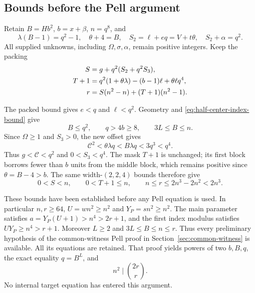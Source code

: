 \subsection{Bounds before the Pell argument}

Retain $B=Hb^2$, $b=x+\beta$, $n=q^8$, and
\begin{equation}\label{eq:half-center-coding}
 \lambda(B-1)=q^2-1,\quad \theta+4=B,\quad
 S_2=\ell+eq=V+t\theta,\quad S_2+\alpha=q^2.
\end{equation}
All supplied unknowns, including $\Omega,\sigma,\alpha$, remain
positive integers. Keep the packing
\begin{align}
 S&=g+q^2(S_2+q^2S_3),\notag\\
 T+1&=q^2(1+\theta\lambda)-(b-1)\ell+\theta\ell q^4,\notag\\
 r&=S(n^2-n)+(T+1)(n^2-1).\label{eq:half-center-packing}
\end{align}

The packed bound gives $e<q$ and $\ell<q^2$. Geometry and
\eqref{eq:half-center-index-bound} give
\[
 B\le q^2,\qquad q>4b\ge8,\qquad 3L\le B\le n.
\]
Since $\Omega\ge1$ and $S_3>0$, the new offset gives
\begin{equation}\label{eq:half-center-preliminary-C}
 \mathcal C^2<\theta\lambda q<B\lambda q<3q^3<q^4.
\end{equation}
Thus $g<\mathcal C<q^2$ and $0<S_3<q^4$. The mask $T+1$ is
unchanged; its first block borrows fewer than $b$ units from the
middle block, which remains positive since $\theta=B-4>b$.
The same width-$(2,2,4)$ bounds therefore give
\begin{equation}\label{eq:half-center-packing-bounds}
 0<S<n,\qquad 0<T+1\le n,\qquad
 n\le r\le2n^3-2n^2<2n^3.
\end{equation}

These bounds have been established before any Pell equation is
used. In particular $n,r\ge64$, $U=w n^2\ge n^2$ and
$Y_P=s n^2\ge n^2$. The main parameter satisfies
$a=Y_P(U+1)>n^4>2r+1$, and the first index modulus satisfies
$UY_P\ge n^4>r+1$. Moreover $L\ge2$ and
$3L\le B\le n\le r$. Thus every preliminary hypothesis of the
common-witness Pell proof in Section~\ref{sec:common-witness} is
available. All its equations are retained. That proof yields powers
of two $b,B,q$, the exact equality $q=B^L$, and
\begin{equation}\label{eq:half-center-binomial}
 n^2\mid\binom{2r}{r}.
\end{equation}
No internal target equation has entered this argument.

